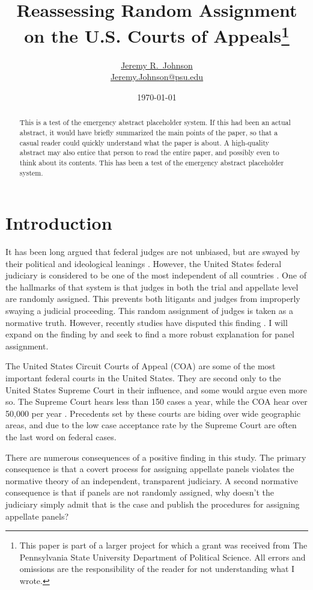 \documentclass[12pt]{article}
\title{Reassessing Random Assignment on the U.S. Courts of Appeals\footnote{This paper is part of a larger project for which a grant was received from The Pennsylvania State University Department of Political Science.  All errors and omissions are the responsibility of the reader for not understanding what I wrote.} }
\author{\href{http://www.jeremyrjohnson.org/}{Jeremy R.\ Johnson}\\ \href{mailto:Jeremy.Johnson@psu.edu}{Jeremy.Johnson@psu.edu}}
\affil{Pennsylvania State University}
\date{\today}
\begin{document}
\clearpage\maketitle\thispagestyle{empty}


\begin{abstract}
	\medskip
	This is a test of the emergency abstract placeholder system.  If this had been an actual abstract, it would have briefly summarized the main points of the paper, so that a casual reader could quickly understand what the paper is about.  A high-quality abstract may also entice that person to read the entire paper, and possibly even to think about its contents.  This has been a test of the emergency abstract placeholder system. \\
\end{abstract}

\clearpage
\setcounter{page}{1}
\setcounter{footnote}{0}
\renewcommand*{\thefootnote}{\arabic{footnote}}
\addtolength{\footnotesep}{6pt}

\section*{Introduction}
It has been long argued that federal judges are not unbiased, but are swayed by their political and ideological leanings \citep{segal2002supreme}.  However, the United States federal judiciary is considered to be one of the most independent of all countries \citep{Linzer2014}.  One of the hallmarks of that system is that judges in both the trial and appellate level are randomly assigned.  This prevents both litigants and judges from improperly swaying a judicial proceeding.  This random assignment of judges is taken as a normative truth.  However, recently studies have disputed this finding \citep{Chilton2014}.  I will expand on the finding by \citeauthor{Chilton2014} and seek to find a more robust explanation for panel assignment.

The United States Circuit Courts of Appeal (COA) are some of the most important federal courts in the United States.  They are second only to the United States Supreme Court in their influence, and some would argue even more so.  The Supreme Court hears less than 150 cases a year, while the COA hear over 50,000 per year \citep{Caseloadstats}.  Precedents set by these courts are biding over wide geographic areas, and due to the low case acceptance rate by the Supreme Court are often the last word on federal cases.

There are numerous consequences of a positive finding in this study.  The primary consequence is that a covert process for assigning appellate panels violates the normative theory of an independent, transparent judiciary.  A second normative consequence is that if panels are not randomly assigned, why doesn't the judiciary simply admit that is the case and publish the procedures for assigning appellate panels?  
\end{document}
